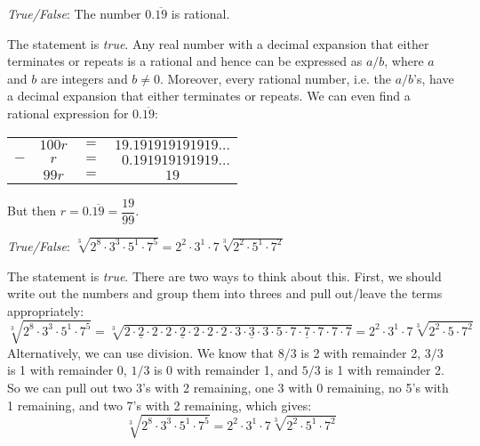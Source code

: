 \documentclass[11pt,letterpaper]{article}
\begin{document}
\quizsol \textit{True/False}: The number $0.\overline{19}$ is rational. \pspace

\sol The statement is \textit{true}. Any real number with a decimal expansion that either terminates or repeats is a rational and hence can be expressed as $a/b$, where $a$ and $b$ are integers and $b \neq 0$. Moreover, every rational number, i.e. the $a/b$'s, have a decimal expansion that either terminates or repeats. We can even find a rational expression for $0.\overline{19}$:
	\begin{table}[!ht]
	\centering
	\begin{tabular}{rccc}
	 & $100r$ & $=$ & $19.191919191919\ldots$ \\ 
	$-$& $r$ & $=$ & $\phantom{0}0.191919191919\ldots$ \\ \hline
	& $99r$ & $=$ & $19$ 
	\end{tabular}
	\end{table} \par
But then $r= 0.\overline{19}= \dfrac{19}{99}$. \pvspace{1.5cm}

 

\quizsol \textit{True/False}: $\sqrt[3]{2^8 \cdot 3^3 \cdot 5^1 \cdot 7^5}= 2^2 \cdot 3^1 \cdot 7 \sqrt[3]{2^2 \cdot 5^1 \cdot 7^2}$ \pspace

\sol The statement is \textit{true}. There are two ways to think about this. First, we should write out the numbers and group them into threes and pull out/leave the terms appropriately:
	\[
	\sqrt[3]{2^8 \cdot 3^3 \cdot 5^1 \cdot 7^5}= \sqrt[3]{\underline{2 \cdot 2 \cdot 2} \cdot \underline{2 \cdot 2 \cdot 2} \cdot 2 \cdot 2 \cdot \underline{3 \cdot 3 \cdot 3} \cdot 5 \cdot \underline{7 \cdot 7 \cdot 7} \cdot 7 \cdot 7}= 2^2 \cdot 3^1 \cdot 7 \sqrt[3]{2^2 \cdot 5 \cdot 7^2}
	\]
Alternatively, we can use division. We know that $8/3$ is 2 with remainder 2, $3/3$ is 1 with remainder 0, $1/3$ is 0 with remainder 1, and $5/3$ is 1 with remainder 2. So we can pull out two 3's with 2 remaining, one 3 with 0 remaining, no 5's with 1 remaining, and two 7's with 2 remaining, which gives:
	\[
	\sqrt[3]{2^8 \cdot 3^3 \cdot 5^1 \cdot 7^5}= 2^2 \cdot 3^1 \cdot 7 \sqrt[3]{2^2 \cdot 5^1 \cdot 7^2}
	\]
\end{document}
